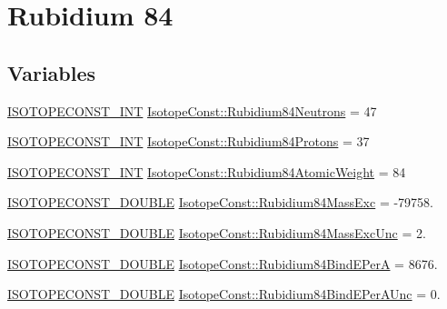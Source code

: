\hypertarget{group___isotope_const-_rubidium-_rb84}{}\section{Rubidium 84}
\label{group___isotope_const-_rubidium-_rb84}
\subsection*{Variables}
\begin{DoxyCompactItemize}
\item 
\mbox{\hyperlink{group___isotope_const-_macros_ga5f18360b3e99483a35c32d789e62621c}{I\+S\+O\+T\+O\+P\+E\+C\+O\+N\+S\+T\+\_\+\+I\+NT}} \mbox{\hyperlink{group___isotope_const-_rubidium-_rb84_ga7f30fc732eaeb208e2059411f2f8aabb}{Isotope\+Const\+::\+Rubidium84\+Neutrons}} = 47
\item 
\mbox{\hyperlink{group___isotope_const-_macros_ga5f18360b3e99483a35c32d789e62621c}{I\+S\+O\+T\+O\+P\+E\+C\+O\+N\+S\+T\+\_\+\+I\+NT}} \mbox{\hyperlink{group___isotope_const-_rubidium-_rb84_ga56c3daa120de18942ed0b45ddea619fd}{Isotope\+Const\+::\+Rubidium84\+Protons}} = 37
\item 
\mbox{\hyperlink{group___isotope_const-_macros_ga5f18360b3e99483a35c32d789e62621c}{I\+S\+O\+T\+O\+P\+E\+C\+O\+N\+S\+T\+\_\+\+I\+NT}} \mbox{\hyperlink{group___isotope_const-_rubidium-_rb84_ga4fa71c26608fe4afd73e0b254ae99f50}{Isotope\+Const\+::\+Rubidium84\+Atomic\+Weight}} = 84
\item 
\mbox{\hyperlink{group___isotope_const-_macros_ga8f45a7272ce02c0b4c65c44636ed719a}{I\+S\+O\+T\+O\+P\+E\+C\+O\+N\+S\+T\+\_\+\+D\+O\+U\+B\+LE}} \mbox{\hyperlink{group___isotope_const-_rubidium-_rb84_gabc8796a19ac597428c262272b539d942}{Isotope\+Const\+::\+Rubidium84\+Mass\+Exc}} = -\/79758.
\item 
\mbox{\hyperlink{group___isotope_const-_macros_ga8f45a7272ce02c0b4c65c44636ed719a}{I\+S\+O\+T\+O\+P\+E\+C\+O\+N\+S\+T\+\_\+\+D\+O\+U\+B\+LE}} \mbox{\hyperlink{group___isotope_const-_rubidium-_rb84_ga1ea6e3fb6f6dc900ea06f367cb7e16fb}{Isotope\+Const\+::\+Rubidium84\+Mass\+Exc\+Unc}} = 2.
\item 
\mbox{\hyperlink{group___isotope_const-_macros_ga8f45a7272ce02c0b4c65c44636ed719a}{I\+S\+O\+T\+O\+P\+E\+C\+O\+N\+S\+T\+\_\+\+D\+O\+U\+B\+LE}} \mbox{\hyperlink{group___isotope_const-_rubidium-_rb84_ga6fcca4828f25e7ec83de5d6e584c3289}{Isotope\+Const\+::\+Rubidium84\+Bind\+E\+PerA}} = 8676.
\item 
\mbox{\hyperlink{group___isotope_const-_macros_ga8f45a7272ce02c0b4c65c44636ed719a}{I\+S\+O\+T\+O\+P\+E\+C\+O\+N\+S\+T\+\_\+\+D\+O\+U\+B\+LE}} \mbox{\hyperlink{group___isotope_const-_rubidium-_rb84_ga8e06eb44ae3c630babc522111514312b}{Isotope\+Const\+::\+Rubidium84\+Bind\+E\+Per\+A\+Unc}} = 0.

\end{DoxyCompactItemize}
